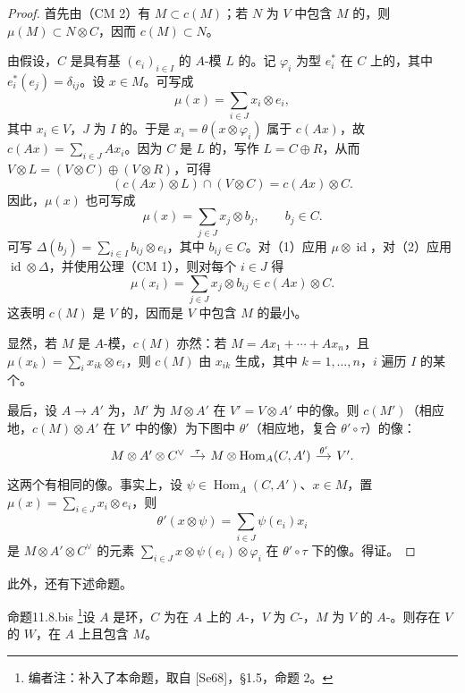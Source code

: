 \begin{proof}
首先由（CM 2）有 $M\subset c(M)$；若 $N$ 为 $V$ 中包含 $M$ 的，则 $\mu(M)\subset N\otimes C$，因而 $c(M)\subset N$。

由假设，$C$ 是具有基 $(e_i)_{i\in I}$ 的 $A$-模 $L$ 的。记 $\varphi_i$ 为型 $e_i^*$ 在 $C$ 上的，其中 $e_i^*(e_j)=\delta_{ij}$。设 $x\in M$。可写成
\[
\mu(x)=\sum_{i\in J}x_i\otimes e_i,\tag{1}
\]
其中 $x_i\in V$，$J$ 为 $I$ 的。于是 $x_i=\theta(x\otimes\varphi_i)$ 属于 $c(Ax)$，故 $c(Ax)=\sum_{i\in J}Ax_i$。因为 $C$ 是 $L$ 的，写作 $L=C\oplus R$，从而 $V\otimes L=(V\otimes C)\oplus(V\otimes R)$，可得
\[
(c(Ax)\otimes L)\cap(V\otimes C)=c(Ax)\otimes C.
\]
因此，$\mu(x)$ 也可写成
\[
\mu(x)=\sum_{j\in J}x_j\otimes b_j,\qquad b_j\in C.\tag{2}
\]
可写 $\Delta(b_j)=\sum_{i\in I}b_{ij}\otimes e_i$，其中 $b_{ij}\in C$。对（1）应用 $\mu\otimes\operatorname{id}$，对（2）应用 $\operatorname{id}\otimes\Delta$，并使用公理（CM 1），则对每个 $i\in J$ 得
\[
\mu(x_i)=\sum_{j\in J}x_j\otimes b_{ij}\in c(Ax)\otimes C.
\]
这表明 $c(M)$ 是 $V$ 的，因而是 $V$ 中包含 $M$ 的最小。

显然，若 $M$ 是 $A$-模，$c(M)$ 亦然：若 $M=Ax_1+\cdots+Ax_n$，且 $\mu(x_k)=\sum_i x_{ik}\otimes e_i$，则 $c(M)$ 由 $x_{ik}$ 生成，其中 $k=1,\ldots,n$，$i$ 遍历 $I$ 的某个。

最后，设 $A\to A'$ 为，$M'$ 为 $M\otimes A'$ 在 $V'=V\otimes A'$ 中的像。则 $c(M')$（相应地，$c(M)\otimes A'$ 在 $V'$ 中的像）为下图中 $\theta'$（相应地，复合 $\theta'\circ\tau$）的像：
\[
\begin{tikzcd}[column sep=small]
M\otimes A'\otimes C^\vee\arrow[r,"\tau"]&M\otimes\operatorname{Hom}_A(C,A')\arrow[r,"\theta'"]&V'.
\end{tikzcd}
\]
这两个有相同的像。事实上，设 $\psi\in\operatorname{Hom}_A(C,A')$、$x\in M$，置 $\mu(x)=\sum_{i\in J}x_i\otimes e_i$，则
\[
\theta'(x\otimes\psi)=\sum_{i\in J}\psi(e_i)x_i
\]
是 $M\otimes A'\otimes C^\vee$ 的元素 $\sum_{i\in J}x\otimes\psi(e_i)\otimes\varphi_i$ 在 $\theta'\circ\tau$ 下的像。得证。
\end{proof}
此外，还有下述命题。
\begin{SGAresult}{命题}{11.8.bis}
\footnote{编者注：补入了本命题，取自 [Se68]，§1.5，命题 2。}设 $A$ 是环，$C$ 为在 $A$ 上的 $A$-，$V$ 为 $C$-，$M$ 为 $V$ 的 $A$-。则存在 $V$ 的 $W$，在 $A$ 上且包含 $M$。
\end{SGAresult}
